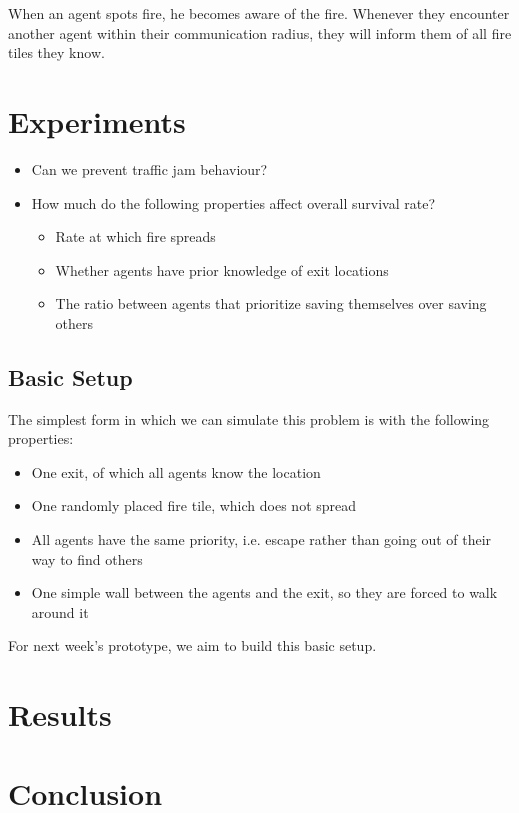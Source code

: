 \documentclass[a4paper]{article}
\begin{document}
When an agent spots fire, he becomes aware of the fire. Whenever they encounter another agent within their communication radius, they will inform them of all fire tiles they know.

\section{Experiments}
\begin{itemize}
\item Can we prevent traffic jam behaviour?
\item How much do the following properties affect overall survival rate?
\begin{itemize}
\item Rate at which fire spreads
\item Whether agents have prior knowledge of exit locations
\item The ratio between agents that prioritize saving themselves over saving others
\end{itemize}
\end{itemize}

\subsection{Basic Setup}
The simplest form in which we can simulate this problem is with the following properties:
\begin{itemize}
\item One exit, of which all agents know the location
\item One randomly placed fire tile, which does not spread
\item All agents have the same priority, i.e. escape rather than going out of their way to find others
\item One simple wall between the agents and the exit, so they are forced to walk around it
\end{itemize}
For next week's prototype, we aim to build this basic setup.

\section{Results}

\section{Conclusion}
\end{document}
